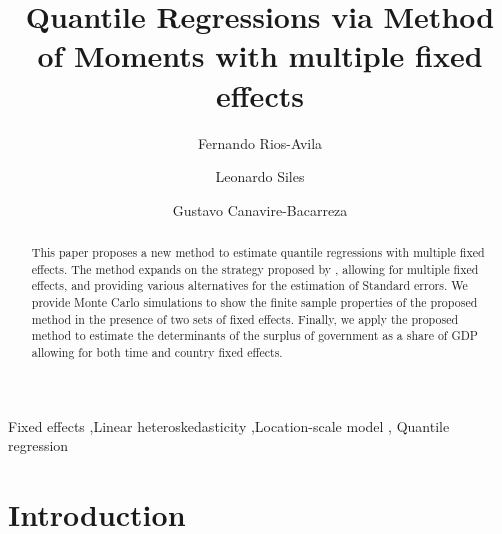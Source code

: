 \documentclass[
  authoryear,
  review,
  1p]{elsarticle}
\begin{document}
\begin{frontmatter}
\title{Quantile Regressions via Method of Moments with multiple fixed
effects}
\author[1]{Fernando Rios-Avila%
%
}
\author[2]{Leonardo Siles%
%
}
\author[3]{Gustavo Canavire-Bacarreza%
%
}




        
\begin{abstract}
This paper proposes a new method to estimate quantile regressions with
multiple fixed effects. The method expands on the strategy proposed by
\citet{mss2019}, allowing for multiple fixed effects, and providing
various alternatives for the estimation of Standard errors. We provide
Monte Carlo simulations to show the finite sample properties of the
proposed method in the presence of two sets of fixed effects. Finally,
we apply the proposed method to estimate the determinants of the surplus
of government as a share of GDP allowing for both time and country fixed
effects.
\end{abstract}





\begin{keyword}
    Fixed effects \sep Linear heteroskedasticity \sep Location-scale
model \sep 
    Quantile regression
\end{keyword}
\end{frontmatter}
    \ifdefined\Shaded\renewenvironment{Shaded}{\begin{tcolorbox}[interior hidden, borderline west={3pt}{0pt}{shadecolor}, boxrule=0pt, sharp corners, enhanced, breakable, frame hidden]}{\end{tcolorbox}}\fi

\hypertarget{introduction}{%
\section{Introduction}\label{introduction}}
\end{document}
